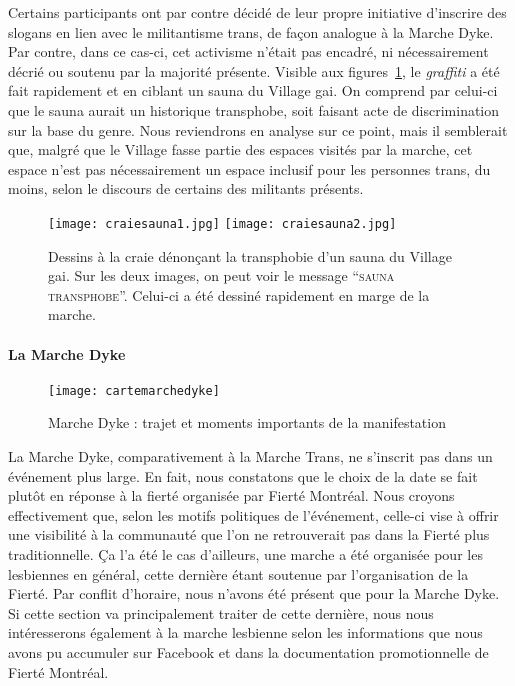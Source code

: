 Certains participants ont par contre décidé de leur propre initiative d'inscrire des slogans en lien avec le militantisme trans, de façon analogue à la Marche Dyke.
Par contre, dans ce cas-ci, cet activisme n'était pas encadré, ni nécessairement décrié ou soutenu par la majorité présente.
Visible aux figures~\ref{figs:craietrottoir}, le \emph{graffiti} a été fait rapidement et en ciblant un sauna du Village gai.
On comprend par celui-ci que le sauna aurait un historique transphobe, soit faisant acte de discrimination sur la base du genre.
Nous reviendrons en analyse sur ce point, mais il semblerait que, malgré que le Village fasse partie des espaces visités par la marche, cet espace n'est pas nécessairement un espace inclusif pour les personnes trans, du moins, selon le discours de certains des militants présents.

\begin{figure}[ht]
  \centering
  {\texttt{[image: craiesauna1.jpg]}}
  {\texttt{[image: craiesauna2.jpg]}}
  \caption[Dessin à la craie contre la transphobie]{Dessins à la craie dénonçant la transphobie d'un sauna du Village gai. Sur les deux images, on peut voir le message \enquote{\textsc{sauna transphobe}}. Celui-ci a été dessiné rapidement en marge de la marche.}\label{figs:craietrottoir}
\end{figure}

\paragraph{La Marche Dyke}
\label{subsubsec:marchedyke}

\begin{figure}[h]
  \centering
  \texttt{[image: cartemarchedyke]}
  \caption[Marche Dyke: trajet et événements]{Marche Dyke : trajet et moments importants de la manifestation}
  \label{fig:cartemarchedyke}
\end{figure}

La Marche Dyke, comparativement à la Marche Trans, ne s'inscrit pas dans un événement plus large.
En fait, nous constatons que le choix de la date se fait plutôt en réponse à la fierté organisée par Fierté Montréal.
Nous croyons effectivement que, selon les motifs politiques de l'événement, celle-ci vise à offrir une visibilité à la communauté \dyke{} que l'on ne retrouverait pas dans la Fierté plus traditionnelle.
Ça l'a été le cas d'ailleurs, une marche a été organisée pour les lesbiennes en général, cette dernière étant soutenue par l'organisation de la Fierté.
Par conflit d'horaire, nous n'avons été présent que pour la Marche Dyke.
Si cette section va principalement traiter de cette dernière, nous nous intéresserons également à la marche lesbienne selon les informations que nous avons pu accumuler sur Facebook et dans la documentation promotionnelle de Fierté Montréal.


